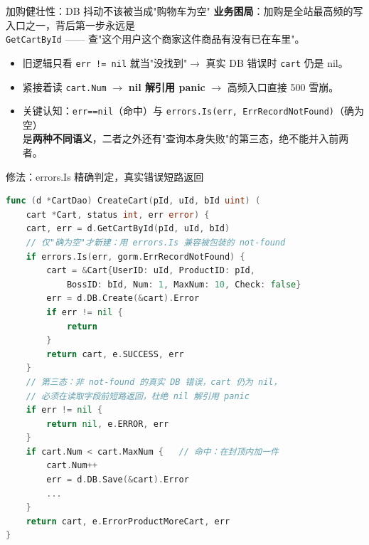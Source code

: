 \documentclass[aspectratio=169,11pt]{beamer}
\begin{document}
\begin{frame}[shrink]{加购健壮性：DB 抖动不该被当成"购物车为空"}
\textbf{业务困局}：加购是全站最高频的写入口之一，背后第一步永远是\\
\texttt{GetCartById} —— 查"这个用户这个商家这件商品有没有已在车里"。
\vspace{2mm}
\vspace{2mm}
\begin{itemize}
  \item 旧逻辑只看 \texttt{err != nil} 就当"没找到"$\to$ 真实 DB 错误时 \texttt{cart} 仍是 nil。
  \item 紧接着读 \texttt{cart.Num} $\to$ \textbf{nil 解引用 panic} $\to$ 高频入口直接 500 雪崩。
  \item 关键认知：\texttt{err==nil}（命中）与 \texttt{errors.Is(err, ErrRecordNotFound)}（确为空）\\
        是\textbf{两种不同语义}，二者之外还有"查询本身失败"的第三态，绝不能并入前两者。
\end{itemize}
\end{frame}

\begin{frame}{修法：errors.Is 精确判定，真实错误短路返回}
\begin{lstlisting}[language=Go,firstnumber=22,
  caption={}]
func (d *CartDao) CreateCart(pId, uId, bId uint) (
    cart *Cart, status int, err error) {
    cart, err = d.GetCartById(pId, uId, bId)
    // 仅"确为空"才新建：用 errors.Is 兼容被包装的 not-found
    if errors.Is(err, gorm.ErrRecordNotFound) {
        cart = &Cart{UserID: uId, ProductID: pId,
            BossID: bId, Num: 1, MaxNum: 10, Check: false}
        err = d.DB.Create(&cart).Error
        if err != nil {
            return
        }
        return cart, e.SUCCESS, err
    }
    // 第三态：非 not-found 的真实 DB 错误，cart 仍为 nil，
    // 必须在读取字段前短路返回，杜绝 nil 解引用 panic
    if err != nil {
        return nil, e.ERROR, err
    }
    if cart.Num < cart.MaxNum {   // 命中：在封顶内加一件
        cart.Num++
        err = d.DB.Save(&cart).Error
        ...
    }
    return cart, e.ErrorProductMoreCart, err
}
\end{lstlisting}
\end{frame}
\end{document}
